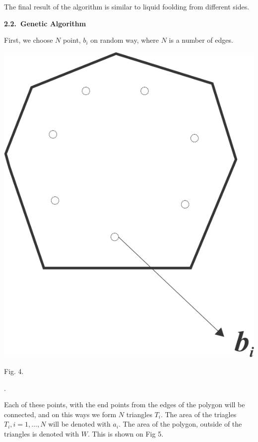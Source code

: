 \documentclass[11pt,leqno]{book}
\newcommand{\subsect}[1]{\vskip 3mm\par{\bf#1}}
\begin{document}
The final result of the algorithm is similar to liquid foolding from different sides.

\subsect{2.2.~Genetic Algorithm}

First, we choose $N$ point, $b_i$  on random way, where $N$ is a number of edges.

\begin{center}

\includegraphics {pic04.png}

Fig. 4.
\label{fig4}
\end{center}.

Each of these points, with the end points from the edges of the polygon will be connected, and on this ways we form $N$ triangles  $T_i$. The area of the triagles $T_i, i=1, \ldots, N $ will be denoted with $a_i$. The area of the polygon, outside of the triangles is denoted with $W$.  This is shown on Fig 5.
\end{document}
